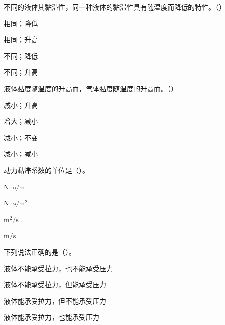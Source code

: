 \begin{ti}
\item[1-5] 不同的液体其黏滞性\underline{\hspace{2em}}，同一种液体的黏滞性具有随温度\underline{\hspace{2em}}而降低的特性。（\quad）
\begin{choices}
\item 相同；降低
\item 相同；升高
\item 不同；降低
\item 不同；升高
\end{choices}

\item[1-6] 液体黏度随温度的升高而\underline{\hspace{2em}}，气体黏度随温度的升高而\underline{\hspace{2em}}。（\quad）
\begin{choices}
\item 减小；升高
\item 增大；减小
\item 减小；不变
\item 减小；减小
\end{choices}

\item[1-7] 动力黏滞系数的单位是（\quad）。
\begin{choices}
\item $\mathrm{N\cdot s/m}$
\item $\mathrm{N\cdot s/m^2}$
\item $\mathrm{m^2/s}$
\item $\mathrm{m/s}$
\end{choices}

\item[1-8] 下列说法正确的是（\quad）。
\begin{choices}
\item 液体不能承受拉力，也不能承受压力
\item 液体不能承受拉力，但能承受压力
\item 液体能承受拉力，但不能承受压力
\item 液体能承受拉力，也能承受压力
\end{choices}

\end{ti}

